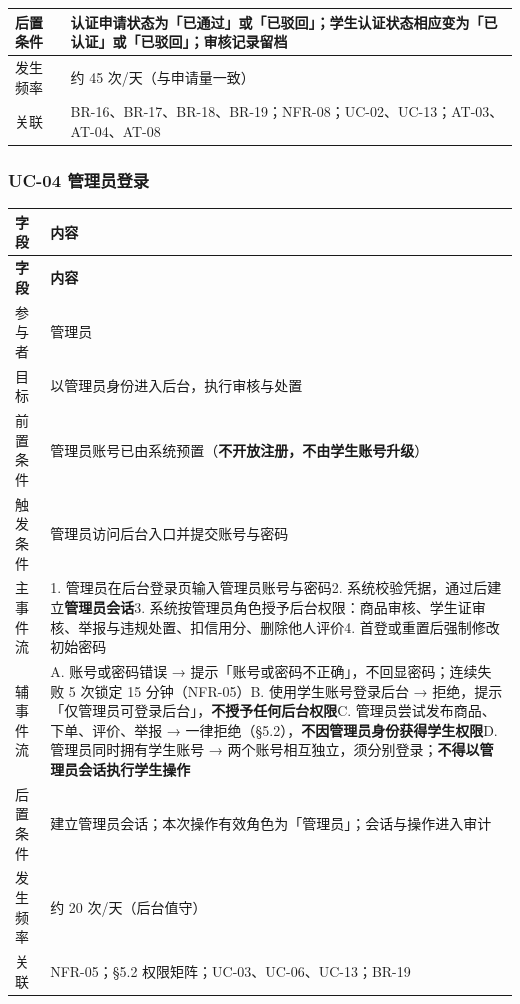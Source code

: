\documentclass[12pt,a4paper]{ctexart}
\begin{document}
{\begin{longtable}{|p{2.75cm}|p{13.25cm}|}
\hline
后置条件 & 认证申请状态为「已通过」或「已驳回」；学生认证状态相应变为「已认证」或「已驳回」；审核记录留档 \\
\hline
发生频率 & 约 45 次/天（与申请量一致） \\
\hline
关联 & BR-16、BR-17、BR-18、BR-19；NFR-08；UC-02、UC-13；AT-03、AT-04、AT-08 \\
\hline
\end{longtable}
}


\subsubsection*{UC-04 管理员登录}

{\scriptsize
\begin{longtable}{|p{2.75cm}|p{13.25cm}|}
\hline
\textbf{字段} & \textbf{内容} \\
\hline
\endfirsthead
\hline
\textbf{字段} & \textbf{内容} \\
\hline
\endhead
\hline
\endfoot
参与者 & 管理员 \\
\hline
目标 & 以管理员身份进入后台，执行审核与处置 \\
\hline
前置条件 & 管理员账号已由系统预置（\textbf{不开放注册，不由学生账号升级}） \\
\hline
触发条件 & 管理员访问后台入口并提交账号与密码 \\
\hline
主事件流 & 1. 管理员在后台登录页输入管理员账号与密码\newline{}2. 系统校验凭据，通过后建立\textbf{管理员会话}\newline{}3. 系统按管理员角色授予后台权限：商品审核、学生证审核、举报与违规处置、扣信用分、删除他人评价\newline{}4. 首登或重置后强制修改初始密码 \\
\hline
辅事件流 & A. 账号或密码错误 → 提示「账号或密码不正确」，不回显密码；连续失败 5 次锁定 15 分钟（NFR-05）\newline{}B. 使用学生账号登录后台 → 拒绝，提示「仅管理员可登录后台」，\textbf{不授予任何后台权限}\newline{}C. 管理员尝试发布商品、下单、评价、举报 → 一律拒绝（§5.2），\textbf{不因管理员身份获得学生权限}\newline{}D. 管理员同时拥有学生账号 → 两个账号相互独立，须分别登录；\textbf{不得以管理员会话执行学生操作} \\
\hline
后置条件 & 建立管理员会话；本次操作有效角色为「管理员」；会话与操作进入审计 \\
\hline
发生频率 & 约 20 次/天（后台值守） \\
\hline
关联 & NFR-05；§5.2 权限矩阵；UC-03、UC-06、UC-13；BR-19 \\
\hline
\end{longtable}
}
\end{document}
